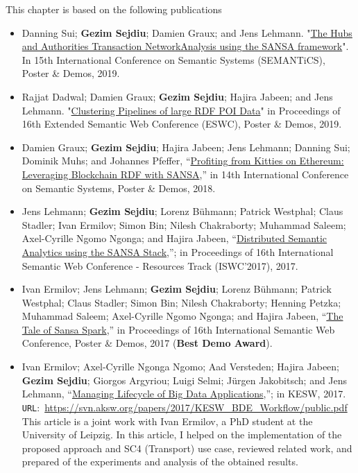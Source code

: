This chapter is based on the following publications~\cite{lehmann-2017-sansa-iswc}
\begin{itemize}


   \item Danning Sui; \textbf{Gezim Sejdiu}; Damien Graux; and Jens Lehmann. "\href{https://gezimsejdiu.github.io/publications/sansa-hubs-and-authorities-transaction-semantics19-poster.pdf}{The Hubs and Authorities Transaction NetworkAnalysis using the SANSA framework}".  In 15th International Conference on Semantic Systems (SEMANTiCS), Poster \& Demos, 2019.
   
    \item Rajjat Dadwal; Damien Graux; \textbf{Gezim Sejdiu}; Hajira Jabeen; and Jens Lehmann. "\href{https://gezimsejdiu.github.io/publications/piping-clustering-eswc19-poster.pdf}{Clustering Pipelines of large RDF POI Data}" in Proceedings of 16th Extended Semantic Web Conference (ESWC), Poster \& Demos, 2019.
   
   \item Damien Graux; \textbf{Gezim Sejdiu}; Hajira Jabeen; Jens Lehmann; Danning Sui; Dominik Muhs; and Johannes Pfeffer, “\href{http://jens-lehmann.org/files/2018/semantics_ethereum_pd.pdf}{Profiting from Kitties on Ethereum: Leveraging Blockchain RDF with SANSA},” in 14th International Conference on Semantic Systems, Poster \& Demos, 2018.
  
    \item Jens Lehmann; \textbf{Gezim Sejdiu}; Lorenz Bühmann; Patrick Westphal; Claus Stadler; Ivan Ermilov; Simon Bin; Nilesh Chakraborty; Muhammad Saleem; Axel-Cyrille Ngomo Ngonga; and Hajira Jabeen, “\href{http://svn.aksw.org/papers/2017/ISWC_SANSA_SoftwareFramework/public.pdf}{Distributed Semantic Analytics using the SANSA Stack},”; in Proceedings of 16th International Semantic Web Conference - Resources Track (ISWC’2017), 2017.

    \item Ivan Ermilov; Jens Lehmann; \textbf{Gezim Sejdiu}; Lorenz Bühmann; Patrick Westphal; Claus Stadler; Simon Bin; Nilesh Chakraborty; Henning Petzka; Muhammad Saleem; Axel-Cyrille Ngomo Ngonga; and Hajira Jabeen, “\href{http://jens-lehmann.org/files/2017/iswc_pd_sansa.pdf}{The Tale of Sansa Spark},” in Proceedings of 16th International Semantic Web Conference, Poster \& Demos, 2017 ({\color{darkred}\textbf{Best Demo Award}}).

    \item Ivan Ermilov; Axel-Cyrille Ngonga Ngomo; Aad Versteden; Hajira Jabeen; \textbf{Gezim Sejdiu}; Giorgos Argyriou; Luigi Selmi; Jürgen Jakobitsch; and Jens Lehmann, “\href{https://svn.aksw.org/papers/2017/KESW_BDE_Workflow/public.pdf}{Managing Lifecycle of Big Data Applications},”; in KESW, 2017. \texttt{URL}:~\url{https://svn.aksw.org/papers/2017/KESW_BDE_Workflow/public.pdf}
    This article is a joint work with Ivan Ermilov, a PhD student at the University of Leipzig. 
    In this article, I helped on the implementation of the proposed approach and SC4 (Transport) use case, reviewed related work, and prepared of the experiments and analysis of the obtained results.


\end{itemize}
